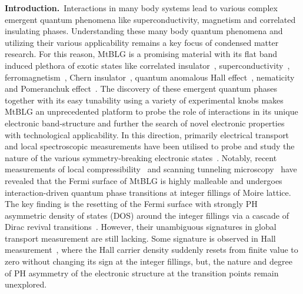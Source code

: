 \documentclass{nature}
\begin{document}



\noindent\textbf{Introduction.}\
Interactions in many body %
systems lead to various complex emergent quantum phenomena like superconductivity, magnetism and correlated insulating phases. Understanding these many body quantum phenomena and utilizing their various applicability remains a key focus of condensed matter research. For this reason, MtBLG %
is a promising material with its flat band~\cite{Bistritzer12233,cao2018correlated,cao2018unconventional} induced plethora of exotic states like correlated insulator~\cite{cao2018correlated,yankowitz2019tuning,wu2021chern,saito2020independent,lu2019superconductors}, superconductivity~\cite{cao2018unconventional,yankowitz2019tuning,lu2019superconductors,arora2020superconductivity,saito2020independent,park_tunable_2021}, ferromagnetism~\cite{Sharpe605}, Chern insulator~\cite{wu2021chern,das_symmetry-broken_2021,nuckolls_strongly_2020,choi_correlation-driven_2021,stepanov2020competing,Andrew2021}, quantum anomalous Hall effect~\cite{Serlin900}, nematicity~\cite{jiang2019charge,cao_nematicity_2021} and Pomeranchuk effect~\cite{rozen2020entropic,saito2021isospin}. The discovery of these emergent quantum phases together with its easy tunability using a variety of experimental knobs makes MtBLG an unprecedented platform to probe the role of interactions in its unique electronic band-structure and further the search of novel electronic properties with technological applicability. In this direction, primarily electrical transport and local spectroscopic measurements have been utilised to probe and study the nature of the various symmetry-breaking electronic states~\cite{choi2019electronic,xie2019spectroscopic,kerelsky2019maximized,wong2020cascade,zondiner2020cascade}. Notably, recent measurements of local compressibility~\cite{zondiner2020cascade} and scanning tunneling microscopy~\cite{wong2020cascade} have revealed that the Fermi surface of MtBLG is highly malleable and undergoes interaction-driven quantum phase transitions at integer fillings of Moire lattice. The key finding is the resetting of the Fermi surface with strongly PH asymmetric density of states (DOS) around the integer fillings via a cascade of Dirac revival transitions~\cite{wong2020cascade,zondiner2020cascade}. However, their unambiguous signatures in global transport measurement are still lacking. Some signature %
is observed in Hall measurement~\cite{wu2021chern,park_tunable_2021}, where the Hall carrier density suddenly resets from finite value to zero without changing its sign at the integer fillings, but, the nature and degree of PH asymmetry of the electronic structure at the transition points remain unexplored.
\end{document}
